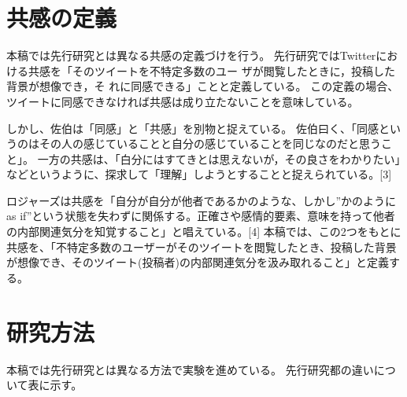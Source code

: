 \documentclass[dvipdfmx]{issj}
\begin{document}
\section{共感の定義}  %
本稿では先行研究とは異なる共感の定義づけを行う。
先行研究ではTwitterにおける共感を「そのツイートを不特定多数のユー ザが閲覧したときに，投稿した背景が想像でき，そ れに同感できる」ことと定義している。
この定義の場合、ツイートに同感できなければ共感は成り立たないことを意味している。


しかし、佐伯は「同感」と「共感」を別物と捉えている。
佐伯曰く、「同感というのはその人の感じていることと自分の感じていることを同じなのだと思うこと」。
一方の共感は、「白分にはすてきとは思えないが，その良さをわかりたい」などというように、探求して「理解」しようとすることと捉えられている。[3]


ロジャーズは共感を「自分が自分が他者であるかのような、しかし”かのようにas if”という状態を失わずに関係する。正確さや感情的要素、意味を持って他者の内部関連気分を知覚すること」と唱えている。[4] 本稿では、この2つをもとに共感を、「不特定多数のユーザーがそのツイートを閲覧したとき、投稿した背景が想像でき、そのツイート(投稿者)の内部関連気分を汲み取れること」と定義する。



\section{研究方法}  %
本稿では先行研究とは異なる方法で実験を進めている。
先行研究都の違いについて表に示す。
\end{document}
